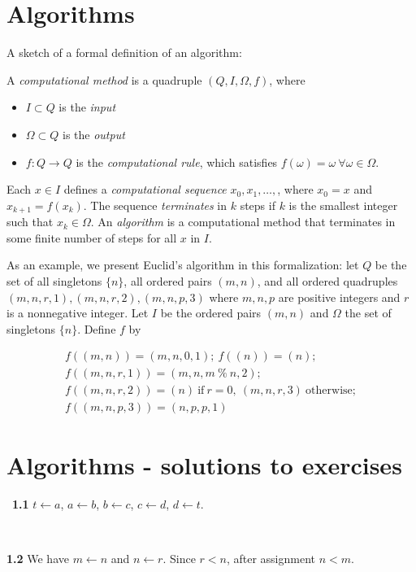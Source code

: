 \documentclass{article}
\begin{document}
\section{Algorithms}

A sketch of a formal definition of an algorithm:

A \emph{computational method} is a quadruple $(Q,I,\Omega,f)$, where
\begin{itemize}
  \item $I\subset Q$ is the \emph{input}
  \item $\Omega \subset Q$ is the \emph{output}
  \item $f : Q \rightarrow Q$ is the \emph{computational rule}, which satisfies $f(\omega) = \omega\ \forall \omega \in \Omega$.
\end{itemize}

Each $x\in I$ defines a \emph{computational sequence} $x_0,x_1,\dots,$, where $x_0=x$ and $x_{k+1} = f(x_k)$. The sequence \emph{terminates} in $k$ steps if $k$ is the smallest integer such that $x_k \in \Omega$. An \emph{algorithm} is a computational method that terminates in some finite number of steps for all $x$ in $I$.

As an example, we present Euclid's algorithm in this formalization: let $Q$ be the set of all singletons $\{n\}$, all ordered pairs $(m,n)$, and all ordered quadruples $(m,n,r,1),(m,n,r,2),(m,n,p,3)$ where $m,n,p$ are positive integers and $r$ is a nonnegative integer. Let $I$ be the ordered pairs $(m,n)$ and $\Omega$ the set of singletons $\{n\}$. Define $f$ by

\begin{align}
  f((m,n)) = (m,n,0,1);\ f((n)) = (n); \\
  f((m,n,r,1)) = (m,n, m\ \% \ n, 2); \\
  f((m,n,r,2)) = (n)\ \mathrm{if}\ r=0,\ (m,n,r,3)\ \mathrm{otherwise}; \\
  f((m,n,p,3)) = (n,p,p,1)
\end{align}


\section{Algorithms - solutions to exercises}
\
\textbf{1.1} $t \leftarrow a$, $a \leftarrow b$, $b \leftarrow c$, $c \leftarrow d$, $d\leftarrow t$.

\

\textbf{1.2} We have $m \leftarrow n$ and $n \leftarrow r$. Since $r < n$, after assignment $n < m$.
\end{document}
